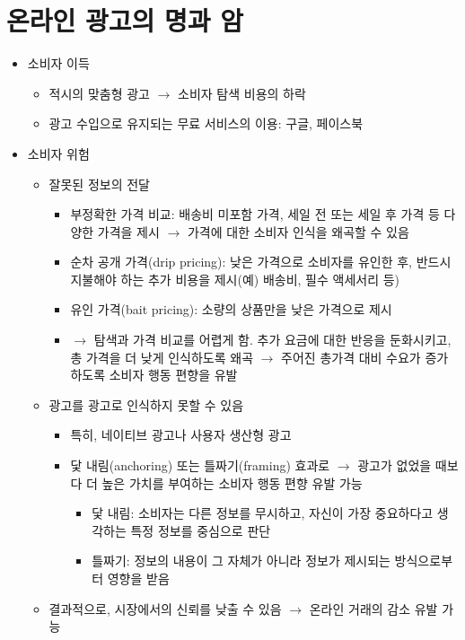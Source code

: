 \section{온라인 광고의 명과 암}
\begin{itemize}
\item 소비자 이득
	\begin{itemize}
	\item 적시의 맞춤형 광고 $\rightarrow$ 소비자 탐색 비용의 하락
	\item 광고 수입으로 유지되는 무료 서비스의 이용: 구글, 페이스북
	\end{itemize}
\item 소비자 위험
	\begin{itemize}
	\item 잘못된 정보의 전달
		\begin{itemize}
		\item 부정확한 가격 비교: 배송비 미포함 가격, 세일 전 또는 세일 후 가격 등 다양한 가격을 제시 $\rightarrow$ 가격에 대한 소비자 인식을 왜곡할 수 있음
		\item 순차 공개 가격(drip pricing): 낮은 가격으로 소비자를 유인한 후, 반드시 지불해야 하는 추가 비용을 제시(예) 배송비, 필수 액세서리 등)
		\item 유인 가격(bait pricing): 소량의 상품만을 낮은 가격으로 제시
		\item $\rightarrow$ 탐색과 가격 비교를 어렵게 함. 추가 요금에 대한 반응을 둔화시키고, 총 가격을 더 낮게 인식하도록 왜곡 $\rightarrow$ 주어진 총가격 대비 수요가 증가하도록 소비자 행동 편향을 유발 \citep{gimminjeong-ihwalyeong:2018vk}
		\end{itemize} 
	\item 광고를 광고로 인식하지 못할 수 있음
		\begin{itemize}
		\item 특히, 네이티브 광고나 사용자 생산형 광고
		\item 닻 내림(anchoring) 또는 틀짜기(framing) 효과로 $\rightarrow$ 광고가 없었을 때보다 더 높은 가치를 부여하는 소비자 행동 편향 유발 가능
			\begin{itemize}
			\item 닻 내림: 소비자는 다른 정보를 무시하고, 자신이 가장 중요하다고 생각하는 특정 정보를 중심으로 판단
			\item 틀짜기: 정보의 내용이 그 자체가 아니라 정보가 제시되는 방식으로부터 영향을 받음
			\end{itemize}
		\end{itemize}
	\item 결과적으로, 시장에서의 신뢰를 낮출 수 있음 $\rightarrow$ 온라인 거래의 감소 유발 가능

\end{itemize}
\end{itemize}
